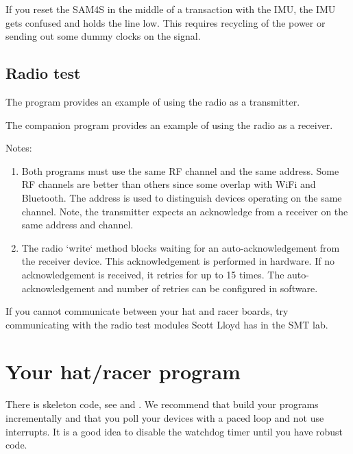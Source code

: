 If you reset the SAM4S in the middle of a transaction with the
IMU, the IMU gets confused and holds the  line low. This
requires recycling of the power or sending out some dummy clocks on
the  signal.


\subsection{Radio test}
\label{radio-test}

The program  provides
an example of using the radio as a transmitter.

The companion program
 provides an example
of using the radio as a receiver.

Notes:
%
\begin{enumerate}
\item
  Both programs must use the same RF channel and the same address. Some
  RF channels are better than others since some overlap with WiFi
  and Bluetooth. The address is used to distinguish devices
  operating on the same channel. Note, the transmitter expects an
  acknowledge from a receiver on the same address and channel.
\item
  The radio `write` method blocks waiting for an auto-acknowledgement
  from the receiver device. This acknowledgement is performed in
  hardware. If no acknowledgement is received, it retries for up to 15
  times. The auto-acknowledgement and number of retries can be
  configured in software.
\end{enumerate}

If you cannot communicate between your hat and racer boards, try
communicating with the radio test modules Scott Lloyd has in the SMT
lab.

\section{Your hat/racer program}
\label{your-hatracer-program}

There is skeleton code, see
 and
. We recommend that
build your programs incrementally and that you poll your devices with a
paced loop and not use interrupts. It is a good idea to disable the
watchdog timer until you have robust code.

